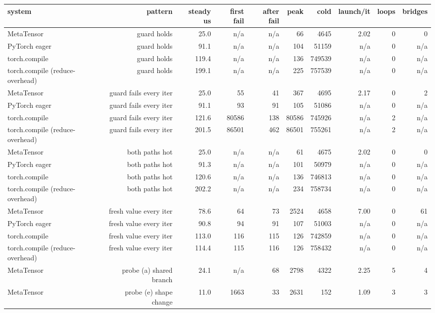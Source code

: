 \begin{tabular}{lrrrrrrrrr}
\toprule
system & pattern & steady us & first fail & after fail & peak & cold & launch/it & loops & bridges \\
\midrule
MetaTensor & guard holds & 25.0 & n/a & n/a & 66 & 4645 & 2.02 & 0 & 0 \\
PyTorch eager & guard holds & 91.1 & n/a & n/a & 104 & 51159 & n/a & 0 & n/a \\
torch.compile & guard holds & 119.4 & n/a & n/a & 136 & 749539 & n/a & 0 & n/a \\
torch.compile (reduce-overhead) & guard holds & 199.1 & n/a & n/a & 225 & 757539 & n/a & 0 & n/a \\
MetaTensor & guard fails every iter & 25.0 & 55 & 41 & 367 & 4695 & 2.17 & 0 & 2 \\
PyTorch eager & guard fails every iter & 91.1 & 93 & 91 & 105 & 51086 & n/a & 0 & n/a \\
torch.compile & guard fails every iter & 121.6 & 80586 & 138 & 80586 & 745926 & n/a & 2 & n/a \\
torch.compile (reduce-overhead) & guard fails every iter & 201.5 & 86501 & 462 & 86501 & 755261 & n/a & 2 & n/a \\
MetaTensor & both paths hot & 25.0 & n/a & n/a & 61 & 4675 & 2.02 & 0 & 0 \\
PyTorch eager & both paths hot & 91.3 & n/a & n/a & 101 & 50979 & n/a & 0 & n/a \\
torch.compile & both paths hot & 120.6 & n/a & n/a & 136 & 746813 & n/a & 0 & n/a \\
torch.compile (reduce-overhead) & both paths hot & 202.2 & n/a & n/a & 234 & 758734 & n/a & 0 & n/a \\
MetaTensor & fresh value every iter & 78.6 & 64 & 73 & 2524 & 4658 & 7.00 & 0 & 61 \\
PyTorch eager & fresh value every iter & 90.8 & 94 & 91 & 107 & 51003 & n/a & 0 & n/a \\
torch.compile & fresh value every iter & 113.0 & 116 & 115 & 126 & 742859 & n/a & 0 & n/a \\
torch.compile (reduce-overhead) & fresh value every iter & 114.4 & 115 & 116 & 126 & 758432 & n/a & 0 & n/a \\
MetaTensor & probe (a) shared branch & 24.1 & n/a & 68 & 2798 & 4322 & 2.25 & 5 & 4 \\
MetaTensor & probe (e) shape change & 11.0 & 1663 & 33 & 2631 & 152 & 1.09 & 3 & 3 \\
\bottomrule
\end{tabular}

